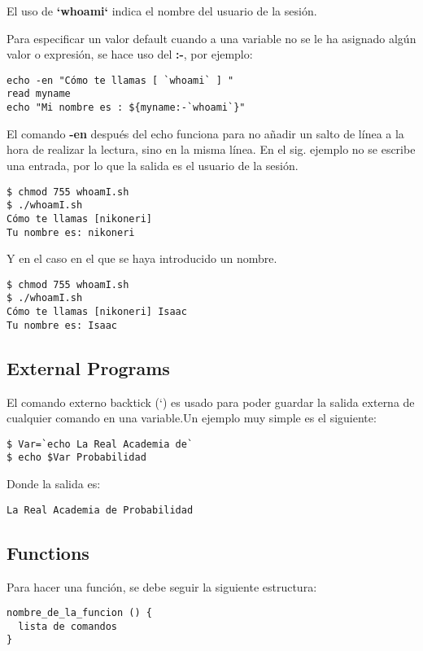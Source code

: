 \documentclass[a4paper]{article}
\begin{document}
El uso de  \textbf{`whoami`} indica el nombre del usuario de la sesión.

Para especificar un valor default cuando a una variable no se le ha asignado algún valor o expresión, se hace uso del \textbf{:-}, por ejemplo:

\begin{verbatim}
echo -en "Cómo te llamas [ `whoami` ] "
read myname
echo "Mi nombre es : ${myname:-`whoami`}"
\end{verbatim}

El comando \textbf{-en} después del echo funciona para no añadir un salto de línea a la hora de realizar la lectura, sino en la misma línea. 
En el sig. ejemplo no se escribe una entrada, por lo que la salida es el usuario de la sesión.

\begin{verbatim}
$ chmod 755 whoamI.sh
$ ./whoamI.sh
Cómo te llamas [nikoneri]
Tu nombre es: nikoneri
\end{verbatim}

Y en el caso en el que se haya introducido un nombre.
\begin{verbatim}
$ chmod 755 whoamI.sh
$ ./whoamI.sh
Cómo te llamas [nikoneri] Isaac
Tu nombre es: Isaac
\end{verbatim}

\subsection{External Programs}

El comando externo backtick (`) es usado para  poder guardar la salida externa de cualquier comando en una variable.Un ejemplo muy simple es el siguiente:

\begin{verbatim}
$ Var=`echo La Real Academia de`
$ echo $Var Probabilidad
\end{verbatim}

Donde la salida es:
\begin{verbatim}
La Real Academia de Probabilidad
\end{verbatim}

\subsection{Functions}
Para hacer una función, se debe seguir la siguiente estructura:

\begin{verbatim}
nombre_de_la_funcion () { 
  lista de comandos
}
\end{verbatim}
\end{document}
